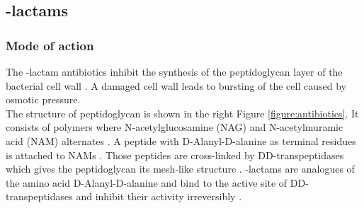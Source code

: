 \subsection{\textbeta-lactams}
\subsubsection{Mode of action}
The \textbeta-lactam antibiotics inhibit the synthesis of the peptidoglycan layer of the bacterial cell wall \cite{noauthor_-lactam_2019}. A damaged cell wall leads to bursting of the cell caused by osmotic pressure. \\
The structure of peptidoglycan is shown in the right Figure \ref{figure:antibiotics}. It consists of polymers where N-acetylglucosamine (NAG) and N-acetylmuramic acid (NAM) alternates \cite{fisher_bacterial_2005}. A peptide with D-Alanyl-D-alanine as terminal residues is attached to NAMs \cite{fisher_bacterial_2005}. Those peptides are cross-linked by DD-transpeptidases which gives the peptidoglycan its mesh-like structure \cite{fisher_bacterial_2005}. \textbeta-lactams are analogues of the amino acid D-Alanyl-D-alanine and bind to the active site of DD-transpeptidases and inhibit their activity irreversibly \cite{fisher_bacterial_2005}. 

